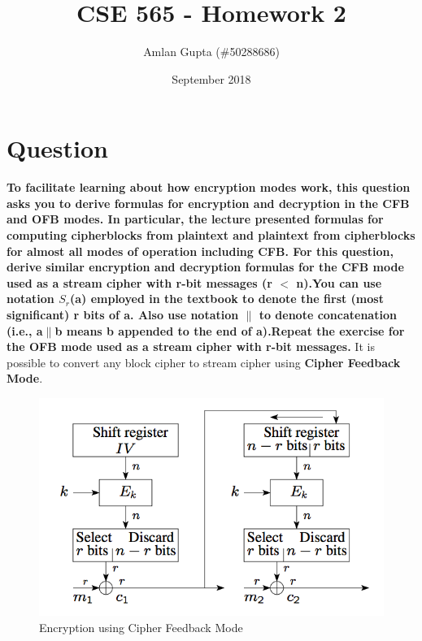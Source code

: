 \documentclass{article}
\title{CSE 565 - Homework 2}
\author{Amlan Gupta (\#50288686)}
\date{September 2018}
\begin{document}
\maketitle

\section {Question}

\textbf{To facilitate learning about how encryption modes work, this question asks you to derive formulas for encryption and decryption in the CFB and OFB modes. In particular, the lecture presented formulas for computing cipherblocks from plaintext and plaintext from cipherblocks for almost all modes of operation including CFB. For this question, derive similar encryption and decryption formulas for the CFB mode used as a stream cipher with r-bit messages (r $<$ n).You can use notation $S_r$(a) employed in the textbook to denote the first (most significant) r bits of a. Also use notation $\|$ to denote concatenation (i.e., a$\|$b means b appended to the end of a).\newline Repeat the exercise for the OFB mode used as a stream cipher with r-bit messages.}
\newline \newline It is possible to convert any block cipher to stream cipher using \textbf{Cipher Feedback Mode}.

\begin{figure}[h]
\centering
\includegraphics[scale=0.5]{cfb_encryption.png}
\caption{Encryption using Cipher Feedback Mode \citep{lecture3_marina}}
\label{fig:cfb_encryption}
\end{figure}
\end{document}
